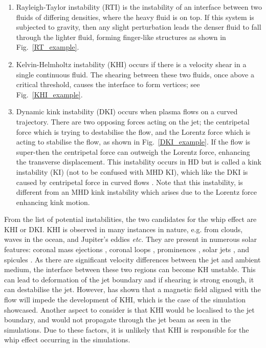 \begin{enumerate}
    \item Rayleigh-Taylor instability (RTI) is the instability of an interface between two fluids of differing densities, where the heavy fluid is on top. If this system is subjected to gravity, then any slight perturbation leads the denser fluid to fall through the lighter fluid, forming finger-like structures as shown in Fig.~\ref{RT_example}.
    \item Kelvin-Helmholtz instability (KHI) occurs if there is a velocity shear in a single continuous fluid. The shearing between these two fluids, once above a critical threshold, causes the interface to form vertices; see Fig.~\ref{KHI_example}.    
    \item Dynamic kink instability (DKI) occurs when plasma flows on a curved trajectory. There are two opposing forces acting on the jet; the centripetal force which is trying to destabilise the flow, and the Lorentz force which is acting to stabilise the flow, as shown in Fig.~\ref{DKI_example}. If the flow is super-\Alfvenic then the centripetal force can outweigh the Lorentz force, enhancing the transverse displacement. This instability occurs in HD but is called a kink instability (KI) (not to be confused with MHD KI), which like the DKI is caused by centripetal force in curved flows \citep{Drazin2002ihsbookD}. Note that this instability, is different from an MHD kink instability which arises due to the Lorentz force enhancing kink motion.
\end{enumerate}
From the list of potential instabilities, the two candidates for the whip effect are KHI or DKI. KHI is observed in many instances in nature, e.g. from clouds, waves in the ocean, and Jupiter's eddies \textit{etc.}  They are present in numerous solar features: coronal mass ejections \citep{Foullon2011ApJ729L8F, Foullon2013ApJ767170F}, coronal loops \citep{Barbulescu2019ApJ870108B}, prominences \citep{Berger2010ApJ7161288B, Ryutova2010SoPh26775R}, solar jets \citep{Filippov2015MNRAS4511117F,Li2018NatSR88136L}, and spicules \citep{Kuridze2016ApJ830133K, Antolin2018ApJ85644A}. As there are significant velocity differences between the jet and ambient medium, the interface between these two regions can become KH unstable. This can lead to deformation of the jet boundary and if shearing is strong enough, it can destabilise the jet. However, \cite{Chandrasekhar1961hhsbookC} has shown that a magnetic field aligned with the flow will impede the development of KHI, which is the case of the simulation showcased. Another aspect to consider is that KHI would be localised to the jet boundary, and would not propagate through the jet beam as seen in the simulations. Due to these factors, it is unlikely that KHI is responsible for the whip effect occurring in the simulations. \np 
